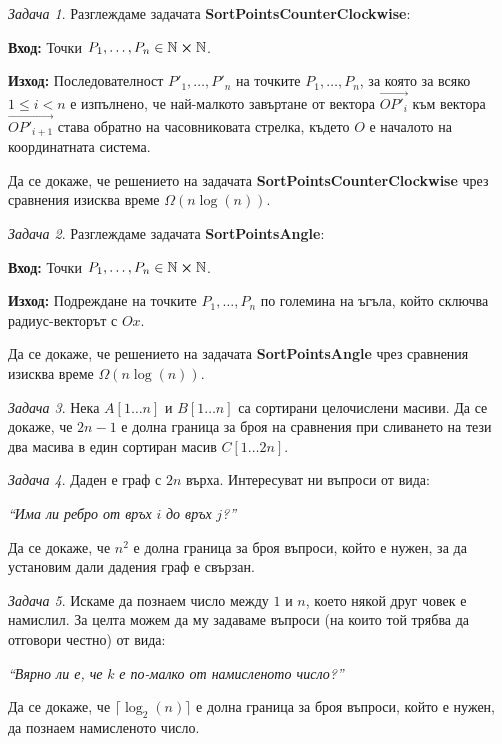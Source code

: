 \documentclass{article}
\newcommand{\N}{\mathbb{N}}
\theoremstyle{definition}
\theoremstyle{plain}
\theoremstyle{remark}
\newtheorem{problem}{Задача}
\theoremstyle{definition}
\begin{document}
\begin{problem}
Разглеждаме задачата \textbf{SortPointsCounterClockwise}:

\vspace*{2mm}
\textbf{Вход:} Точки $P_1, \dots, P_n \in \N \cross \N$.

\textbf{Изход:} Последователност $P'_1, \dots, P'_n$ на точките $P_1, \dots, P_n$, за която за всяко $1 \leq i < n$ е изпълнено, че най-малкото завъртане от вектора $\overrightarrow{OP'_i}$ към вектора $\overrightarrow{OP'_{i + 1}}$ става обратно на часовниковата стрелка, където $O$ е началото на координатната система.
\vspace*{2mm}

Да се докаже, че решението на задачата \textbf{SortPointsCounterClockwise} чрез сравнения изисква време $\Omega(n \log(n))$.
\end{problem}

\begin{problem}
Разглеждаме задачата \textbf{SortPointsAngle}:

\vspace*{2mm}
\textbf{Вход:} Точки $P_1, \dots, P_n \in \N \cross \N$.

\textbf{Изход:} Подреждане на точките $P_1, \dots, P_n$ по големина на ъгъла, който сключва радиус-векторът с $Ox$.
\vspace*{2mm}

Да се докаже, че решението на задачата \textbf{SortPointsAngle} чрез сравнения изисква време $\Omega(n \log(n))$.
\end{problem}

\begin{problem}
Нека $A[1 \dots n]$ и $B[1 \dots n]$ са сортирани целочислени масиви.
Да се докаже, че $2n - 1$ е долна граница за броя на сравнения при сливането на тези два масива в един сортиран масив $C[1 \dots 2n]$.
\end{problem}

\begin{problem}
Даден е граф с $2n$ върха.
Интересуват ни въпроси от вида:
\begin{center}
    \textit{``Има ли ребро от връх} $i$ \textit{до връх} $j$\textit{?''}
\end{center}
Да се докаже, че $n^2$ е долна граница за броя въпроси, който е нужен, за да установим дали дадения граф е свързан.
\end{problem}

\begin{problem}
Искаме да познаем число между $1$ и $n$, което някой друг човек е намислил.
За целта можем да му задаваме въпроси (на които той трябва да отговори честно) от вида:
\begin{center}
    \textit{``Вярно ли е, че} $k$ \textit{е по-малко от намисленото число?''}
\end{center}
Да се докаже, че $\lceil \log_2(n) \rceil$ е долна граница за броя въпроси, който е нужен, да познаем намисленото число.
\end{problem}
\end{document}
